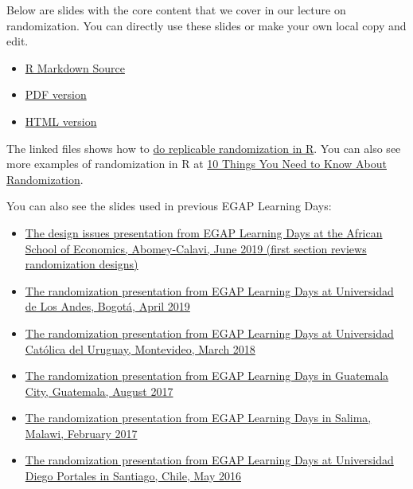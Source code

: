 \documentclass[12pt,]{book}
\begin{document}
Below are slides with the core content that we cover in our lecture on randomization. You can directly use these slides or make your own local copy and edit.

\begin{itemize}
\item
  \href{https://egap.github.io/learningdays-resources/Slides/randomization-slides.Rmd}{R Markdown Source}
\item
  \href{https://egap.github.io/learningdays-resources/Slides/randomization-slides.pdf}{PDF version}
\item
  \href{https://egap.github.io/learningdays-resources/Slides/randomization-slides.html}{HTML version}
\end{itemize}

The linked files shows how to \href{https://egap.github.io/learningdays-resources/Exercises/randomization-exercises.Rmd}{do replicable randomization in R}. You can also see more examples of randomization in R at \href{https://egap.org/resource/10-things-you-need-know-randomization}{10 Things You Need to Know About Randomization}.

You can also see the slides used in previous EGAP Learning Days:

\begin{itemize}
\item
  \href{https://egap.github.io/learningdays-resources/Slides/Examples/threats-benin.pdf}{The design issues presentation from EGAP Learning Days at the African School of Economics, Abomey-Calavi, June 2019 (first section reviews randomization designs)}
\item
  \href{https://egap.github.io/learningdays-resources/Slides/Examples/randomization-bogota.pdf}{The randomization presentation from EGAP Learning Days at Universidad de Los Andes, Bogotá, April 2019}
\item
  \href{https://egap.github.io/learningdays-resources/Slides/Examples/randomization-montevideo.pdf}{The randomization presentation from EGAP Learning Days at Universidad Católica del Uruguay, Montevideo, March 2018}
\item
  \href{https://egap.github.io/learningdays-resources/Slides/Examples/randomization-guatemala.pdf}{The randomization presentation from EGAP Learning Days in Guatemala City, Guatemala, August 2017}
\item
  \href{https://egap.github.io/learningdays-resources/Slides/Examples/randomization-malawi.pdf}{The randomization presentation from EGAP Learning Days in Salima, Malawi, February 2017}
\item
  \href{https://egap.github.io/learningdays-resources/Slides/Examples/randomization-santiago.pdf}{The randomization presentation from EGAP Learning Days at Universidad Diego Portales in Santiago, Chile, May 2016}
\end{itemize}
\end{document}
